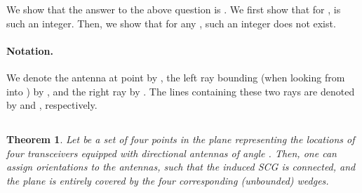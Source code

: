 \documentclass[11pt,letter]{article}
\newtheorem{theorem}{Theorem}[section]
\begin{document}
We show that the answer to the above question is .
We first show that for ,  is such an integer. Then, we show that for any , such an integer  does not exist.

\paragraph{Notation.}
We denote the antenna at point  by ,
the left ray bounding  (when looking from  into ) by ,
and the right ray by .
The lines containing these two rays are denoted by  and , respectively.

\subsection {}


\begin{theorem} \label{thm:fourpoints}
Let  be a set of four points in the plane representing the locations of four transceivers equipped with directional antennas of angle .
Then, one can assign orientations to the antennas, such that
the induced SCG is connected,
and the plane is entirely covered by the four corresponding (unbounded) wedges.
\end{theorem}
\end{document}
